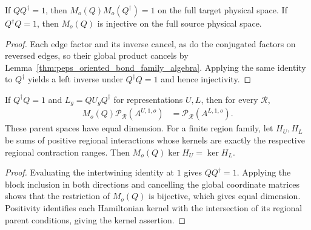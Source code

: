 \begin{lemma}%
    \label{thm:peps_oriented_global_coordinate_inverse}
    \leanok
    If $QQ^\dagger=1$, then $M_o(Q)M_o(Q^\dagger)=1$ on the
    full target physical space. If $Q^\dagger Q=1$, then $M_o(Q)$
    is injective on the full source physical space.
\end{lemma}
\begin{proof}\leanok
    Each edge factor and its inverse cancel, as do the conjugated factors
    on reversed edges, so their global product
    cancels by Lemma~\ref{thm:peps_oriented_bond_family_algebra}.
    Applying the same identity to $Q^\dagger$ yields a left inverse
    under $Q^\dagger Q=1$ and hence injectivity.
\end{proof}

\begin{lemma}%
    \label{thm:peps_oriented_coordinate_parent}
    \leanok
    If $Q^\dagger Q=1$ and $L_g=QU_gQ^\dagger$ for representations
    $U,L$, then for every $\mathcal R$,
    \begin{align}
        M_o(Q)\mathcal P_{\mathcal R}(A^{U,1,o})
         & =\mathcal P_{\mathcal R}(A^{L,1,o}).
        \label{eq:peps_oriented_coordinate_parent}
    \end{align}
    These parent spaces have equal dimension. For a finite region
    family, let $H_U,H_L$ be sums of positive regional interactions
    whose kernels are exactly the respective regional contraction
    ranges. Then $M_o(Q)\ker H_U=\ker H_L$.
\end{lemma}
\begin{proof}\leanok
    Evaluating the intertwining identity at $1$ gives $QQ^\dagger=1$.
    Applying the block inclusion in both directions and cancelling the global
    coordinate matrices shows that the restriction of $M_o(Q)$ is bijective,
    which gives equal dimension. Positivity identifies each Hamiltonian
    kernel with the intersection of its regional parent conditions,
    giving the kernel assertion.
\end{proof}

